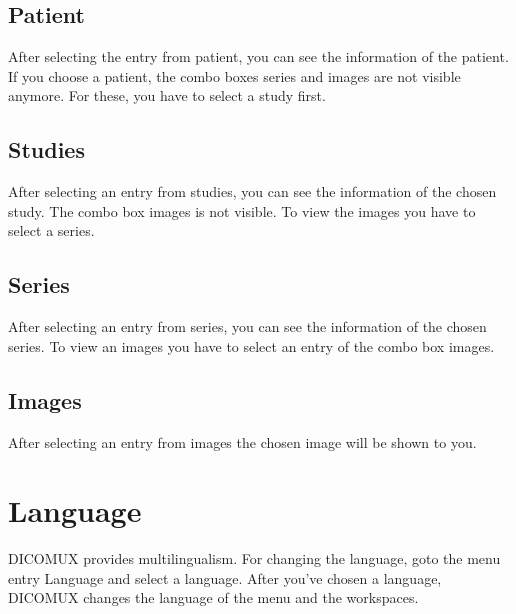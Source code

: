 	\subsection{Patient}
		After selecting the entry from patient, you can see the information of the
		patient. If you choose a patient, the combo boxes series and images are not
		visible anymore. For these, you have to select a study first.
	
	\subsection{Studies}
		After selecting an entry from studies, you can see the information of the chosen study.
		The combo box images is not visible. To view the images you have to
		select a series.\\
	
		\begin{minipage}{\textwidth} 
		\centering
		\label{fig:bild}
		\end{minipage}
	
	\subsection{Series}
		After selecting an entry from series, you can see the information of the chosen
		series. To view an images you have to select an entry of the combo box
		images.\\
	
		\begin{minipage}{\textwidth} 
		\centering
		\label{fig:bild}
		\end{minipage}
	
	\subsection{Images}
		After selecting an entry from images the chosen image will be shown to you.\\
	
		\begin{minipage}{\textwidth} 
		\centering
		\label{fig:bild}
		\end{minipage}
	
\section{Language}
	DICOMUX provides multilingualism. For changing the language, goto the menu entry
	Language and select a language. After you've chosen a language, DICOMUX changes the
	language of the menu and the workspaces.\\

	\begin{minipage}{\textwidth} 
	\centering
	\label{fig:bild}
	\end{minipage}

%
%